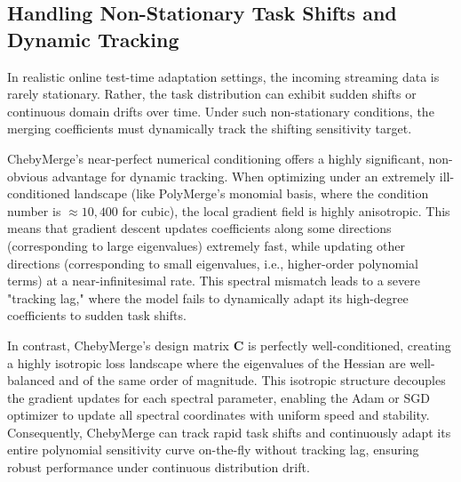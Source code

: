 \documentclass{article}
\theoremstyle{plain}
\theoremstyle{definition}
\theoremstyle{remark}
\begin{document}
\subsection{Handling Non-Stationary Task Shifts and Dynamic Tracking}
In realistic online test-time adaptation settings, the incoming streaming data is rarely stationary. Rather, the task distribution can exhibit sudden shifts or continuous domain drifts over time. Under such non-stationary conditions, the merging coefficients must dynamically track the shifting sensitivity target.

ChebyMerge's near-perfect numerical conditioning offers a highly significant, non-obvious advantage for dynamic tracking. When optimizing under an extremely ill-conditioned landscape (like PolyMerge's monomial basis, where the condition number is $\approx 10,400$ for cubic), the local gradient field is highly anisotropic. This means that gradient descent updates coefficients along some directions (corresponding to large eigenvalues) extremely fast, while updating other directions (corresponding to small eigenvalues, i.e., higher-order polynomial terms) at a near-infinitesimal rate. This spectral mismatch leads to a severe "tracking lag," where the model fails to dynamically adapt its high-degree coefficients to sudden task shifts.

In contrast, ChebyMerge's design matrix $\mathbf{C}$ is perfectly well-conditioned, creating a highly isotropic loss landscape where the eigenvalues of the Hessian are well-balanced and of the same order of magnitude. This isotropic structure decouples the gradient updates for each spectral parameter, enabling the Adam or SGD optimizer to update all spectral coordinates with uniform speed and stability. Consequently, ChebyMerge can track rapid task shifts and continuously adapt its entire polynomial sensitivity curve on-the-fly without tracking lag, ensuring robust performance under continuous distribution drift.
\end{document}
